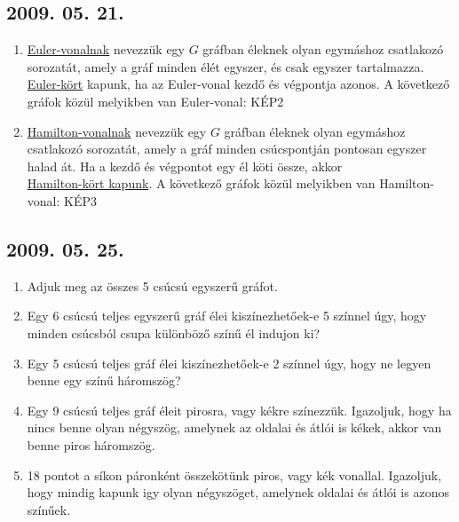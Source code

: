 \documentclass{article}
\begin{document}
\subsection*{2009. 05. 21.}
\begin{enumerate}
\item \underline{Euler-vonalnak} nevezzük egy $G$ gráfban éleknek olyan egymáshoz csatlakozó sorozatát, amely a gráf minden élét egyszer, és csak egyszer tartalmazza. \underline{Euler-kört} kapunk, ha az Euler-vonal kezdő és végpontja azonos. A következő gráfok közül melyikben van Euler-vonal: KÉP2
\item \underline{Hamilton-vonalnak} nevezzük egy $G$ gráfban éleknek olyan egymáshoz csatlakozó sorozatát, amely a gráf minden csúcspontján pontosan egyszer halad át. 
Ha a kezdő és végpontot egy él köti össze, akkor\\ \underline{Hamilton-kört kapunk}.
A következő gráfok közül melyikben van Hamilton-vonal: KÉP3
\end{enumerate}



\subsection*{2009. 05. 25.}
\begin{enumerate}
\item Adjuk meg az összes 5 csúcsú egyszerű gráfot.
\item Egy 6 csúcsú teljes egyszerű gráf élei kiszínezhetőek-e 5 színnel úgy, hogy minden csúcsból csupa különböző színű él indujon ki?
\item Egy 5 csúcsú teljes gráf élei kiszínezhetőek-e 2 színnel úgy, hogy ne legyen benne egy színű háromszög?
\item Egy 9 csúcsú teljes gráf éleit pirosra, vagy kékre színezzük. Igazoljuk, hogy ha nincs benne olyan négyszög, amelynek az oldalai és átlói is kékek, akkor van benne piros háromszög.
\item 18 pontot a síkon páronként összekötünk piros, vagy kék vonallal. Igazoljuk, hogy mindig kapunk igy olyan négyszöget, amelynek oldalai és átlói is azonos színűek.

\end{enumerate}
\end{document}

